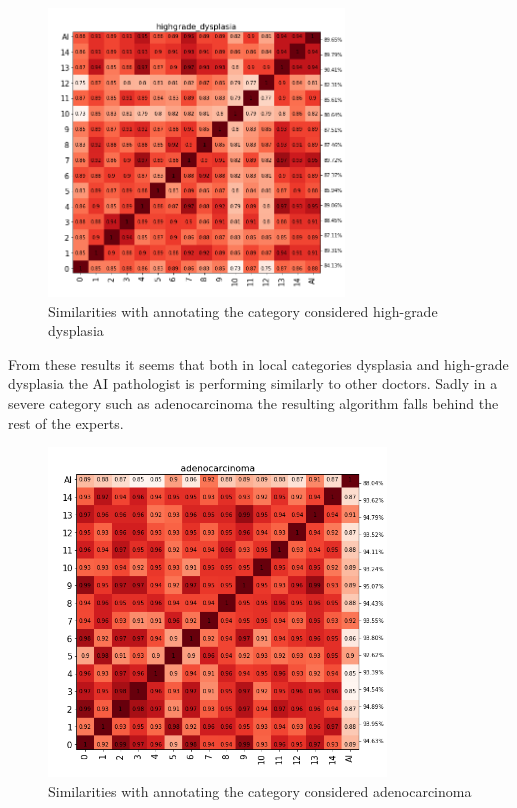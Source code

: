 \documentclass[a4paper,12pt]{article}
\begin{document}
\begin{figure}[H]
    \centering
    \includegraphics[width=0.7\textwidth]{results/similarities_highgrade_dysplasia.png}
    \caption{Similarities with annotating the category considered high-grade dysplasia}
    \label{fig:sim_highgradedysp}
\end{figure}

\vspace{4mm}

\par From these results it seems that both in local categories dysplasia and high-grade dysplasia the AI pathologist is performing similarly to other doctors. Sadly in a severe category such as adenocarcinoma the resulting algorithm falls behind the rest of the experts.

\begin{figure}[H]
    \centering
    \includegraphics[width=0.8\textwidth]{results/similarities_adenocarcinoma.png}
    \caption{Similarities with annotating the category considered adenocarcinoma}
    \label{fig:sim_adeno}
\end{figure}
\end{document}
